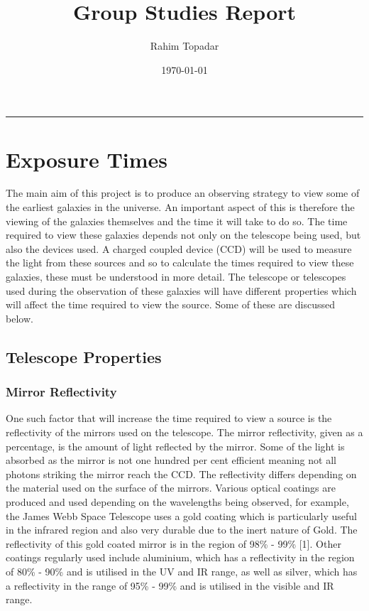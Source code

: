 \documentclass[pdf,color]{UoBnote}
\author{Rahim Topadar}
\title{Group Studies Report}
\date{\today}
\begin{document}
\maketitle
\tableofcontents
\vspace{1cm}\hrule \vspace{1cm}



\section{Exposure Times}

The main aim of this project is to produce an observing strategy to view some of the earliest galaxies in the universe. An important aspect of this is therefore the viewing of the galaxies themselves and the time it will take to do so. The time required to view these galaxies depends not only on the telescope being used, but also the devices used. A charged coupled device (CCD) will be used to measure the light from these sources and so to calculate the times required to view these galaxies, these must be understood in more detail. The telescope or telescopes used during the observation of these galaxies will have different properties which will affect the time required to view the source. Some of these are discussed below.

\subsection{Telescope Properties}
\subsubsection{Mirror Reflectivity}
One such factor that will increase the time required to view a source is the reflectivity of the mirrors used on the telescope. The mirror reflectivity, given as a percentage, is the amount of light reflected by the mirror. Some of the light is absorbed as the mirror is not one hundred per cent efficient meaning not all photons striking the mirror reach the CCD. The reflectivity differs depending on the material used on the surface of the mirrors. Various optical coatings are produced and used depending on the wavelengths being observed, for example, the James Webb Space Telescope uses a gold coating which is particularly useful in the infrared region and also very durable due to the inert nature of Gold. The reflectivity of this gold coated mirror is in the region of 98\% - 99\% [1]. Other coatings regularly used include aluminium, which has a reflectivity in the region of 80\% - 90\% and is utilised in the UV and IR range, as well as silver, which has a reflectivity in the range of 95\% - 99\% and is utilised in the visible and IR range.
\end{document}
